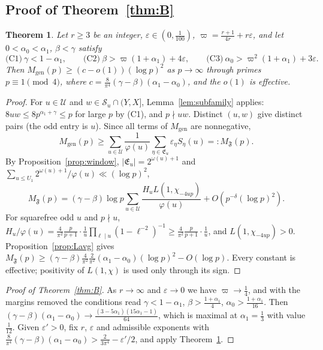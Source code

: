 \documentclass[11pt,reqno]{amsart}
\newtheorem{theorem}{Theorem}[section]
\theoremstyle{definition}
\newcommand{\eps}{\varepsilon}
\newcommand{\cE}{\mathfrak E}
\newcommand{\cF}{\mathfrak F}
\newcommand{\cS}{\mathcal S}
\newcommand{\cU}{\mathcal U}
\newcommand{\Mgen}{M_{\mathrm{gen}}}
\begin{document}
\subsection{Proof of Theorem~\ref{thm:B}}
\begin{theorem}\label{thm:U}
Let $r\ge3$ be an integer, $\eps\in(0,\frac1{100})$, $\varpi=\frac{r+1}{4r}+r\eps$,
and let $0<\alpha_0<\alpha_1$, $\beta<\gamma$ satisfy
\[
 \text{(C1)}\ \gamma<1-\alpha_1,\qquad
 \text{(C2)}\ \beta>\varpi(1+\alpha_1)+4\eps,\qquad
 \text{(C3)}\ \alpha_0>\varpi^2(1+\alpha_1)+3\eps .
\]
Then $\Mgen(p)\ge(c-o(1))(\log p)^2$ as $p\to\infty$ through primes
$p\equiv1\pmod4$, where $c=\frac8{\pi^4}(\gamma-\beta)(\alpha_1-\alpha_0)$, and
the $o(1)$ is effective.
\end{theorem}
\begin{proof}
For $u\in\cU$ and $w\in\cS_u\cap(Y,X]$, Lemma~\ref{lem:subfamily}
applies: $8uw\le8p^{\alpha_1+\gamma}\le p$ for large $p$ by (C1), and
$p\nmid uw$.  Distinct $(u,w)$ give distinct pairs (the odd entry is $u$).
Since all terms of $\Mgen$ are nonnegative,
\[
 \Mgen(p)\ge\sum_{u\in\cU}\frac1{\varphi(u)}\sum_{\eta\in\cE_u}\eps_\eta S_\eta(u)
 =:M_{\cF}(p).
\]
By Proposition~\ref{prop:window}, $|\cE_u|=2^{\omega(u)+1}$ and
$\sum_{u\le U_1}2^{\omega(u)+1}/\varphi(u)\ll(\log p)^2$,
\[
 M_\cF(p)=(\gamma-\beta)\log p\sum_{u\in\cU}\frac{H_uL(1,\chi_{-4up})}{\varphi(u)}+O(p^{-\delta}(\log p)^2).
\]
For squarefree odd $u$ and $p\nmid u$,
$H_u/\varphi(u)=\frac4{\pi^2}\frac p{p+1}\cdot\frac1u\prod_{\ell\mid
u}(1-\ell^{-2})^{-1}\ge\frac4{\pi^2}\frac p{p+1}\cdot\frac1u$, and
$L(1,\chi_{-4up})>0$.  Proposition~\ref{prop:Lavg} gives
$M_\cF(p)\ge(\gamma-\beta)\frac4{\pi^2}\frac2{\pi^2}(\alpha_1-\alpha_0)(\log
p)^2-O(\log p)$.  Every constant is effective; positivity of
$L(1,\chi)$ is used only through its sign.
\end{proof}

\begin{proof}[Proof of Theorem~\ref{thm:B}]
As $r\to\infty$ and $\eps\to0$ we have $\varpi\to\frac14$, and with the
margins removed the conditions read $\gamma<1-\alpha_1$,
$\beta>\frac{1+\alpha_1}4$, $\alpha_0>\frac{1+\alpha_1}{16}$.  Then
$(\gamma-\beta)(\alpha_1-\alpha_0)\to\frac{(3-5\alpha_1)(15\alpha_1-1)}{64}$,
which is maximal at $\alpha_1=\frac13$ with value $\frac1{12}$.  Given
$\eps'>0$, fix $r$, $\eps$ and admissible exponents with
$\frac8{\pi^4}(\gamma-\beta)(\alpha_1-\alpha_0)>\frac2{3\pi^4}-\eps'/2$, and
apply Theorem~\ref{thm:U}.
\end{proof}
\end{document}
